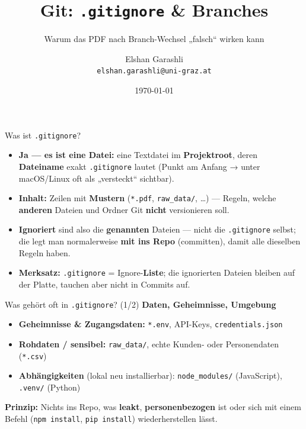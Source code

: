 \documentclass{beamer}
\title{Git: \texttt{.gitignore} \& Branches}
\subtitle{Warum das PDF nach Branch-Wechsel „falsch“ wirken kann}
\author{\texorpdfstring{Elshan Garashli\\\texttt{elshan.garashli@uni-graz.at}}{Elshan Garashli}}
\institute{Universität Graz}
\date{\today}
\begin{document}
\frame{\titlepage}

\begin{frame}{Was ist \texttt{.gitignore}?}
\begin{itemize}
\item \textbf{Ja — es ist eine Datei:} eine Textdatei im \textbf{Projektroot}, deren \textbf{Dateiname} exakt \texttt{.gitignore} lautet (Punkt am Anfang → unter macOS/Linux oft als „versteckt“ sichtbar).
\item \textbf{Inhalt:} Zeilen mit \textbf{Mustern} (\texttt{*.pdf}, \texttt{raw\_data/}, \ldots) — Regeln, welche \textbf{anderen} Dateien und Ordner Git \textbf{nicht} versionieren soll.
\item \textbf{Ignoriert} sind also die \textbf{genannten} Dateien — nicht die \texttt{.gitignore} selbst; die legt man normalerweise \textbf{mit ins Repo} (committen), damit alle dieselben Regeln haben.
\item \textbf{Merksatz:} \texttt{.gitignore} = Ignore-\textbf{Liste}; die ignorierten Dateien bleiben auf der Platte, tauchen aber nicht in Commits auf.
\end{itemize}
\end{frame}

\begin{frame}{Was gehört oft in \texttt{.gitignore}? (1/2)}
\textbf{Daten, Geheimnisse, Umgebung}
\begin{itemize}
\item \textbf{Geheimnisse \& Zugangsdaten:} \texttt{*.env}, API-Keys, \texttt{credentials.json}
\item \textbf{Rohdaten / sensibel:} \texttt{raw\_data/}, echte Kunden- oder Personendaten (\texttt{*.csv})
\item \textbf{Abhängigkeiten} (lokal neu installierbar): \texttt{node\_modules/} (JavaScript), \texttt{.venv/} (Python)
\end{itemize}
\vspace{0.5em}
\textbf{Prinzip:} Nichts ins Repo, was \textbf{leakt}, \textbf{personenbezogen} ist oder sich mit einem Befehl (\texttt{npm install}, \texttt{pip install}) wiederherstellen lässt.
\end{frame}
\end{document}
